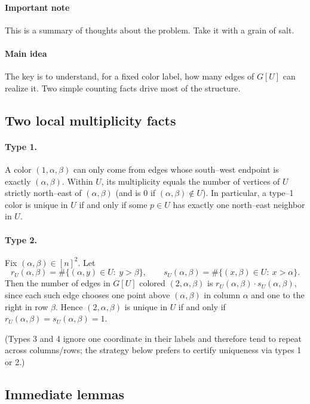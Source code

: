 \paragraph{Important note}
This is a summary of thoughts about the problem. Take it with a grain of salt. 

\paragraph{Main idea}
The key is to understand, for a fixed color label, how many edges of $G[U]$ can realize it. Two simple counting facts drive most of the structure.

\subsection*{Two local multiplicity facts}

\paragraph{Type 1.}
A color $(1,\alpha,\beta)$ can only come from edges whose south--west endpoint is exactly $(\alpha,\beta)$. Within $U$, its multiplicity equals the number of vertices of $U$ strictly north--east of $(\alpha,\beta)$ (and is $0$ if $(\alpha,\beta)\notin U$). In particular, a type--1 color is unique in $U$ if and only if some $p\in U$ has exactly one north--east neighbor in $U$.

\paragraph{Type 2.}
Fix $(\alpha,\beta)\in [n]^2$. Let
\[
r_U(\alpha,\beta)=\#\{(\alpha,y)\in U:\ y>\beta\},\qquad
s_U(\alpha,\beta)=\#\{(x,\beta)\in U:\ x>\alpha\}.
\]
Then the number of edges in $G[U]$ colored $(2,\alpha,\beta)$ is $r_U(\alpha,\beta)\cdot s_U(\alpha,\beta)$, since each such edge chooses one point above $(\alpha,\beta)$ in column $\alpha$ and one to the right in row $\beta$. Hence $(2,\alpha,\beta)$ is unique in $U$ if and only if $r_U(\alpha,\beta)=s_U(\alpha,\beta)=1$.

(Types 3 and 4 ignore one coordinate in their labels and therefore tend to repeat across columns/rows; the strategy below prefers to certify uniqueness via types 1 or 2.)

\subsection*{Immediate lemmas}

